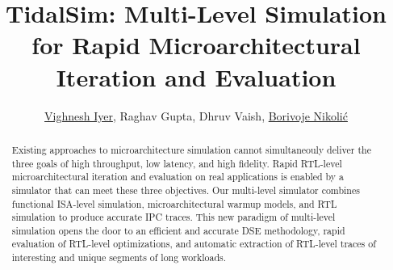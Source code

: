 \documentclass[sigplan,review,nonacm,10pt]{acmart}
\begin{document}
\title{TidalSim: Multi-Level Simulation for Rapid Microarchitectural Iteration and Evaluation}


\author{\href{https://orcid.org/0000-0001-6934-6577}{Vighnesh Iyer}, Raghav Gupta, Dhruv Vaish, \href{https://orcid.org/0000-0003-2324-1715}{Borivoje Nikolić}}



\renewcommand{\shortauthors}{Iyer, Vighnesh et al.}

\begin{abstract}

Existing approaches to microarchitecture simulation cannot simultaneouly deliver the three goals of high throughput, low latency, and high fidelity.
Rapid RTL-level microarchitectural iteration and evaluation on real applications is enabled by a simulator that can meet these three objectives.
Our multi-level simulator combines functional ISA-level simulation, microarchitectural warmup models, and RTL simulation to produce accurate IPC traces.
This new paradigm of multi-level simulation opens the door to an efficient and accurate DSE methodology, rapid evaluation of RTL-level optimizations, and automatic extraction of RTL-level traces of interesting and unique segments of long workloads.

\end{abstract}
\end{document}
